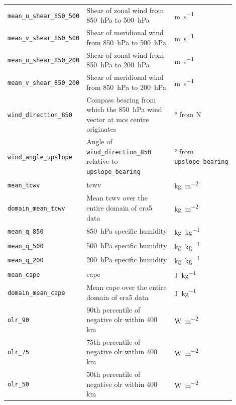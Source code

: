 {\begin{longtable}{>{\raggedright\arraybackslash}p{0.25\linewidth} p{0.50\linewidth} >{\raggedright\arraybackslash}p{0.15\linewidth}}
    \texttt{mean\_u\_shear\_850\_500} & Shear of zonal wind from \SI{850}{\hecto\pascal} to \SI{500}{\hecto\pascal} & \unit{\meter\per\second} \\
    \texttt{mean\_v\_shear\_850\_500} & Shear of meridional wind from \SI{850}{\hecto\pascal} to \SI{500}{\hecto\pascal} & \unit{\meter\per\second} \\
    \texttt{mean\_u\_shear\_850\_200} & Shear of zonal wind from \SI{850}{\hecto\pascal} to \SI{200}{\hecto\pascal} & \unit{\meter\per\second} \\
    \texttt{mean\_v\_shear\_850\_200} & Shear of meridional wind from \SI{850}{\hecto\pascal} to \SI{200}{\hecto\pascal} & \unit{\meter\per\second} \\
    \texttt{wind\_direction\_850} & Compass bearing from which the \SI{850}{\hecto\pascal} wind vector at \acrshort{mcs} centre originates & \unit{\degree} from  N \\
    \texttt{wind\_angle\_upslope} & Angle of \texttt{wind\_direction\_850} relative to \texttt{upslope\_bearing} & \unit{\degree} from \texttt{upslope\_bearing} \\
    \texttt{mean\_tcwv} & \acrfull{tcwv} & \unit{\kilogram\per\meter\squared} \\
    \texttt{domain\_mean\_tcwv} & Mean \acrshort{tcwv} over the entire domain of \acrshort{era5} data & \unit{\kilogram\per\meter\squared} \\
    \texttt{mean\_q\_850} & \SI{850}{\hecto\pascal} specific humidity & \unit{\kilogram\per\kilogram} \\
    \texttt{mean\_q\_500} & \SI{500}{\hecto\pascal} specific humidity & \unit{\kilogram\per\kilogram} \\
    \texttt{mean\_q\_200} & \SI{200}{\hecto\pascal} specific humidity & \unit{\kilogram\per\kilogram} \\
    \texttt{mean\_cape} & \acrfull{cape} & \unit{\joule\per\kilogram} \\
    \texttt{domain\_mean\_cape} & Mean \acrshort{cape} over the entire domain of \acrshort{era5} data & \unit{\joule\per\kilogram} \\
    \texttt{olr\_90} & 90th percentile of negative \acrfull{olr} within 400 km & \unit{\watt\per\square\meter} \\
    \texttt{olr\_75} & 75th percentile of negative \acrshort{olr} within 400 km & \unit{\watt\per\square\meter} \\
    \texttt{olr\_50} & 50th percentile of negative \acrshort{olr} within 400 km & \unit{\watt\per\square\meter} \\

\end{longtable}}
